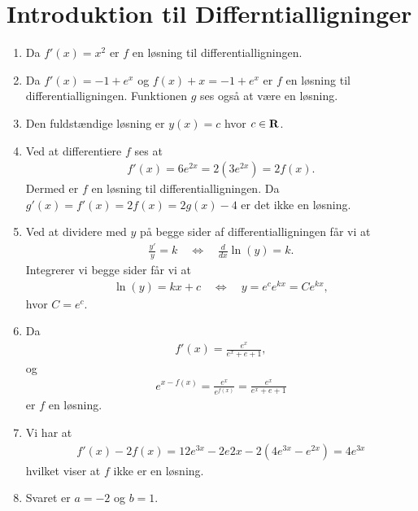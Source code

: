 \section{Introduktion til Differntialligninger}
\begin{enumerate}
	\item Da $ f'(x)=x^2 $ er $f$ en løsning til differentialligningen.
	
	\item Da $f'(x)=-1+e^x$ og $f(x)+x=-1+e^x$ er $f$ en løsning til differentialligningen. Funktionen $g$ ses også at være en løsning. 
	
	
	\item Den fuldstændige løsning er $y(x)=c$ hvor $c\in \mathbf{R}$.
	
	\item Ved at differentiere $f$ ses at 
	\begin{align*}
	f'(x)=6e^{2x}=2(3e^{2x})=2f(x).
	\end{align*}
	Dermed er $f$ en løsning til differentialligningen. Da $g'(x)=f'(x)=2f(x)=2g(x)-4$ er det ikke en løsning.
	
	
	
	\item \label{it:diffeq11ans} Ved at dividere med $y$ på begge sider af differentialligningen får vi at
	\begin{align*}
	\frac{y'}{y}=k\quad\Leftrightarrow\quad \frac{d}{dx} \ln(y)=k.
	\end{align*}
	Integrerer vi begge sider får vi at
	\begin{align*}
	\ln(y)=kx+c\quad\Leftrightarrow\quad y=e^ce^{kx}=Ce^{kx},
	\end{align*}
	hvor $C=e^c$.
	
	\item Da
	\begin{align*}
	f'(x)=\frac{e^x}{e^x+e+1},
	\end{align*}
	og
	\begin{align*}
	e^{x-f(x)}=\frac{e^x}{e^{f(x)}}=\frac{e^x}{e^x+e+1}
	\end{align*}
	er $f$ en løsning.
	
	\item Vi har at
	\begin{align*}
	f'(x)-2f(x)=12e^{3x}-2e{2x}-2(4e^{3x}-e^{2x})=4e^{3x}
	\end{align*}
	hvilket viser at $f$ ikke er en løsning.
	
	\item Svaret er $a=-2$ og $b=1$.


\end{enumerate}
